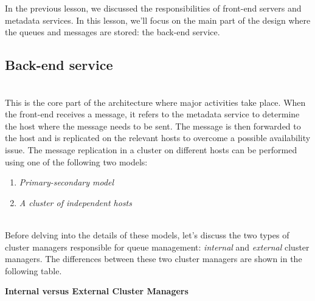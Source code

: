 

In the previous lesson, we discussed the responsibilities of front-end servers and metadata services. In this lesson, we'll focus on the main part of the design where the queues and messages are stored: the back-end service.

\subsection{Back-end service}\label{2ckjmvfLLymBMQthoKIFz}
\\
This is the core part of the architecture where major activities take place. When the front-end receives a message, it refers to the metadata service to determine the host where the message needs to be sent. The message is then forwarded to the host and is replicated on the relevant hosts to overcome a possible availability issue. The message replication in a cluster on different hosts can be performed using one of the following two models:

\begin{enumerate}
\item
\protect{}\label{vGR8wov7tOtVuYxYnC6oC}
\emph{Primary-secondary model}
\item
\protect{}\label{D0uKdXz1HTDJtO73fnrXa}
\emph{A cluster of independent hosts}
\end{enumerate}
\\
Before delving into the details of these models, let's discuss the two types of cluster managers responsible for queue management: \emph{internal} and \emph{external} cluster managers. The differences between these two cluster managers are shown in the following table.

\textbf{Internal versus External Cluster Managers}

